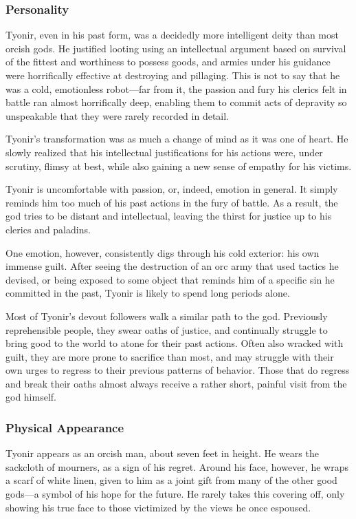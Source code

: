 \subsubsection*{Personality}
Tyonir, even in his past form, was a decidedly more intelligent deity than most orcish gods.
He justified looting using an intellectual argument based on survival of the fittest and worthiness to possess goods, and armies under his guidance were horrifically effective at destroying and pillaging.
This is not to say that he was a cold, emotionless robot---far from it, the passion and fury his clerics felt in battle ran almost horrifically deep, enabling them to commit acts of depravity so unspeakable that they were rarely recorded in detail.

Tyonir's transformation was as much a change of mind as it was one of heart.
He slowly realized that his intellectual justifications for his actions were, under scrutiny, flimsy at best, while also gaining a new sense of empathy for his victims.

Tyonir is uncomfortable with passion, or, indeed, emotion in general.
It simply reminds him too much of his past actions in the fury of battle.
As a result, the god tries to be distant and intellectual, leaving the thirst for justice up to his clerics and paladins.

One emotion, however, consistently digs through his cold exterior: his own immense guilt.
After seeing the destruction of an orc army that used tactics he devised, or being exposed to some object that reminds him of a specific sin he committed in the past, Tyonir is likely to spend long periods alone.

Most of Tyonir's devout followers walk a similar path to the god.
Previously reprehensible people, they swear oaths of justice, and continually struggle to bring good to the world to atone for their past actions.
Often also wracked with guilt, they are more prone to sacrifice than most, and may struggle with their own urges to regress to their previous patterns of behavior.
Those that do regress and break their oaths almost always receive a rather short, painful visit from the god himself.

\subsubsection*{Physical Appearance}
Tyonir appears as an orcish man, about seven feet in height.
He wears the sackcloth of mourners, as a sign of his regret.
Around his face, however, he wraps a scarf of white linen, given to him as a joint gift from many of the other good gods---a symbol of his hope for the future.
He rarely takes this covering off, only showing his true face to those victimized by the views he once espoused.

